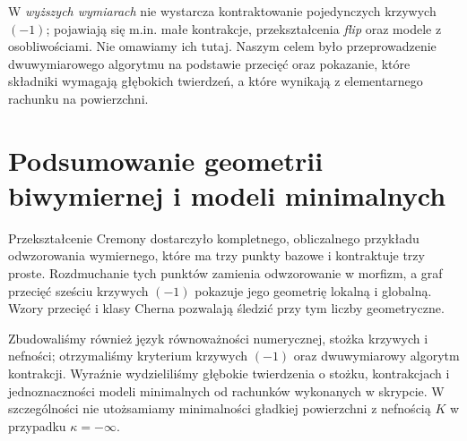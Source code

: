 W \emph{wyższych wymiarach} nie wystarcza
kontraktowanie pojedynczych krzywych $(-1)$;
pojawiają się m.in. małe kontrakcje, przekształcenia
\emph{flip} oraz modele z osobliwościami.
Nie omawiamy ich tutaj. Naszym celem było
przeprowadzenie dwuwymiarowego algorytmu na
podstawie przecięć oraz pokazanie, które składniki
wymagają głębokich twierdzeń, a które wynikają
z elementarnego rachunku na powierzchni.



\section{Podsumowanie geometrii biwymiernej i modeli minimalnych}
\label{sec:ga8-conclusion}

Przekształcenie Cremony dostarczyło kompletnego,
obliczalnego przykładu odwzorowania wymiernego,
które ma trzy punkty bazowe i kontraktuje trzy proste.
Rozdmuchanie tych punktów zamienia odwzorowanie
w morfizm, a graf przecięć sześciu krzywych
$(-1)$ pokazuje jego geometrię lokalną i globalną.
Wzory przecięć i klasy Cherna pozwalają śledzić
przy tym liczby geometryczne.

Zbudowaliśmy również język równoważności numerycznej,
stożka krzywych i nefności; otrzymaliśmy kryterium
krzywych $(-1)$ oraz dwuwymiarowy algorytm kontrakcji.
Wyraźnie wydzieliliśmy głębokie twierdzenia o stożku,
kontrakcjach i jednoznaczności modeli minimalnych od
rachunków wykonanych w skrypcie. W szczególności
nie utożsamiamy minimalności gładkiej powierzchni
z nefnością $K$ w przypadku $\kappa=-\infty$.


